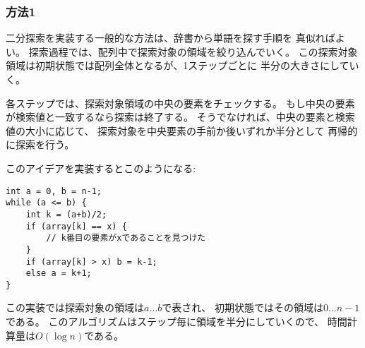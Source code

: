 \subsubsection{方法1}

二分探索を実装する一般的な方法は、辞書から単語を探す手順を
真似ればよい。
探索過程では、配列中で探索対象の領域を絞り込んでいく。
この探索対象領域は初期状態では配列全体となるが、1ステップごとに
半分の大きさにしていく。

各ステップでは、探索対象領域の中央の要素をチェックする。
もし中央の要素が検索値と一致するなら探索は終了する。
そうでなければ、中央の要素と検索値の大小に応じて、
探索対象を中央要素の手前か後いずれか半分として
再帰的に探索を行う。

このアイデアを実装するとこのようになる:

\begin{lstlisting}
int a = 0, b = n-1;
while (a <= b) {
    int k = (a+b)/2;
    if (array[k] == x) {
        // k番目の要素がxであることを見つけた
    }
    if (array[k] > x) b = k-1;
    else a = k+1;
}
\end{lstlisting}

\begin{comment}
In this implementation, the active region is $a \ldots b$,
and initially the region is $0 \ldots n-1$.
The algorithm halves the size of the region at each step,
so the time complexity is $O(\log n)$.
\end{comment}

この実装では探索対象の領域は$a \ldots b$で表され、
初期状態ではその領域は$0 \ldots n-1$である。
このアルゴリズムはステップ毎に領域を半分にしていくので、
時間計算量は$O(\log n)$である。

\begin{comment}
\subsubsection{Method 2}

An alternative method to implement binary search
is based on an efficient way to iterate through
the elements of the array.
The idea is to make jumps and slow the speed
when we get closer to the target element.

The search goes through the array from left to
right, and the initial jump length is $n/2$.
At each step, the jump length will be halved:
first $n/4$, then $n/8$, $n/16$, etc., until
finally the length is 1.
After the jumps, either the target element has
been found or we know that it does not appear in the array.

The following code implements the above idea:
\begin{lstlisting}
int k = 0;
for (int b = n/2; b >= 1; b /= 2) {
    while (k+b < n && array[k+b] <= x) k += b;
}
if (array[k] == x) {
    // x found at index k
}
\end{lstlisting}
\end{comment}

